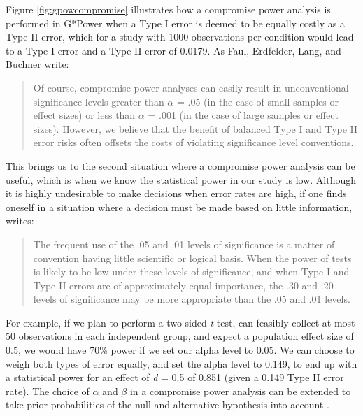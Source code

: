 \documentclass[
  oneside]{book}
\begin{document}
Figure \ref{fig:gpowcompromise} illustrates how a compromise power analysis is performed in G*Power when a Type I error is deemed to be equally costly as a Type II error, which for a study with 1000 observations per condition would lead to a Type I error and a Type II error of 0.0179. As Faul, Erdfelder, Lang, and Buchner \citeyearpar{faul_gpower_2007} write:

\begin{quote}
Of course, compromise power analyses can easily result in unconventional significance levels greater than \(\alpha\) = .05 (in the case of small samples or effect sizes) or less than \(\alpha\) = .001 (in the case of large samples or effect sizes). However, we believe that the benefit of balanced Type I and Type II error risks often offsets the costs of violating significance level conventions.
\end{quote}

This brings us to the second situation where a compromise power analysis can be useful, which is when we know the statistical power in our study is low. Although it is highly undesirable to make decisions when error rates are high, if one finds oneself in a situation where a decision must be made based on little information, \citet{winer_statistical_1962} writes:

\begin{quote}
The frequent use of the .05 and .01 levels of significance is a matter of convention having little scientific or logical basis. When the power of tests is likely to be low under these levels of significance, and when Type I and Type II errors are of approximately equal importance, the .30 and .20 levels of significance may be more appropriate than the .05 and .01 levels.
\end{quote}

For example, if we plan to perform a two-sided \emph{t} test, can feasibly collect at most 50 observations in each independent group, and expect a population effect size of 0.5, we would have 70\% power if we set our alpha level to 0.05. We can choose to weigh both types of error equally, and set the alpha level to 0.149, to end up with a statistical power for an effect of \emph{d} = 0.5 of 0.851 (given a 0.149 Type II error rate). The choice of \(\alpha\) and \(\beta\) in a compromise power analysis can be extended to take prior probabilities of the null and alternative hypothesis into account \citep{maier_justify_2022, murphy_statistical_2014, miller_quest_2019}.
\end{document}

